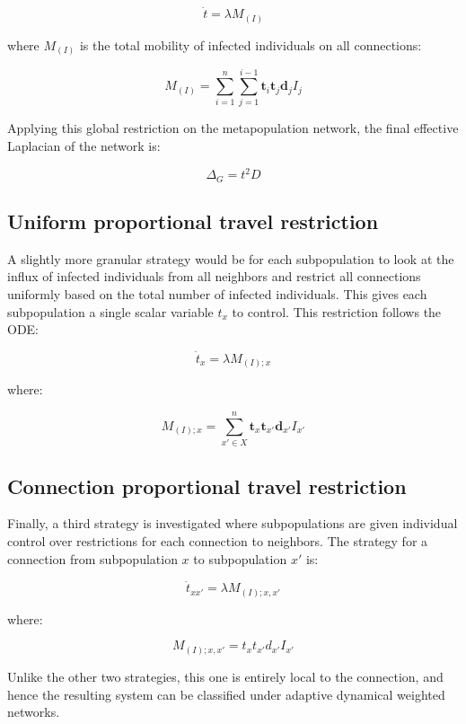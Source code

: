 \begin{equation}
\dot{t} = \lambda M_{(I)}
\end{equation}

where $M_{(I)}$ is the total mobility of infected individuals on all connections:

\begin{equation}
M_{(I)} = \sum_{i=1}^{n} \sum_{j=1}^{i-1} \mathbf{t}_{i} \mathbf{t}_{j} \mathbf{d}_{j} I_{j}
\end{equation}

Applying this global restriction on the metapopulation network, the final effective Laplacian of the network is:

\begin{equation}
\Delta_G = t^2 D
\end{equation}

\subsection{Uniform proportional travel restriction}

A slightly more granular strategy would be for each subpopulation to look at the influx of infected individuals from all neighbors and restrict all connections uniformly based on the total number of infected individuals. This gives each subpopulation a single scalar variable $t_x$ to control. This restriction follows the ODE:

\begin{equation}
\dot{t}_x = \lambda M_{(I);x}
\end{equation}

where:

\begin{equation}
M_{(I);x} = \sum_{x' \in X}^{n} \mathbf{t}_x \mathbf{t}_{x'} \mathbf{d}_{x'} I_{x'}
\end{equation}

\subsection{Connection proportional travel restriction}

Finally, a third strategy is investigated where subpopulations are given individual control over restrictions for each connection to neighbors. The strategy for a connection from subpopulation $x$ to subpopulation $x'$ is:

\begin{equation}
\dot{t}_{xx'} = \lambda M_{(I);x,x'}
\end{equation}

where:

\begin{equation}
M_{(I);x,x'} = t_x t_{x'} d_{x'} I_{x'}
\end{equation}

Unlike the other two strategies, this one is entirely local to the connection, and hence the resulting system can be classified under adaptive dynamical weighted networks\cite{berner2023adaptive}.
